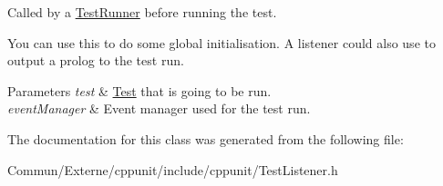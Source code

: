 Called by a \hyperlink{class_test_runner}{Test\+Runner} before running the test. 

You can use this to do some global initialisation. A listener could also use to output a \textquotesingle{}prolog\textquotesingle{} to the test run.


\begin{DoxyParams}{Parameters}
{\em test} & \hyperlink{class_test}{Test} that is going to be run. \\
\hline
{\em event\+Manager} & Event manager used for the test run. \\
\hline
\end{DoxyParams}


The documentation for this class was generated from the following file\+:\begin{DoxyCompactItemize}
\item 
Commun/\+Externe/cppunit/include/cppunit/Test\+Listener.\+h\end{DoxyCompactItemize}
